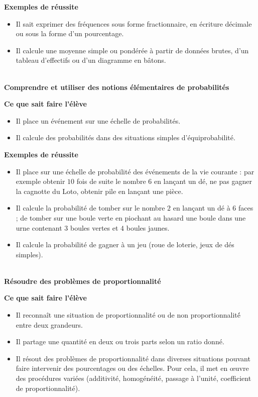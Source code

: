 \documentclass[10pt]{article}
\newcommand{\RR}{\begin{tikzpicture} \draw[Bleu,fill=Bleu] (0,0) circle (0.06); \end{tikzpicture}}
\newcommand{\LR}{\begin{tikzpicture} \draw[Bleu,fill=Bleu] (0.05,0) -- (0,0.075) -- (-0.05,0) -- (0,-0.075) --cycle; \end{tikzpicture}}
\newcommand{\competence}[1]{\par\color{Bleu}\makebox[\linewidth]{\rule{\textwidth}{2pt}}\\{\bfseries\Large#1}\color{black}\vspace{1em}}
\newenvironment{savoireleves}{%
    \renewcommand{\labelitemi}{\RR}%
    \color{black}%
    \par\textbf{Ce que sait faire l'élève}
    \begin{itemize}
    \setlength{\itemsep}{-0.2em}%
}{
    \end{itemize}
}
\newenvironment{exemplesreussite}{%
    \renewcommand{\labelitemi}{\LR}%
    \renewcommand{\labelitemii}{-}%
    \color{black}%
    \par\textbf{Exemples de réussite}
    \begin{itemize}
    \setlength{\itemsep}{-0.2em}%
}{
    \end{itemize}
}
\begin{document}
\begin{exemplesreussite}
        \item Il sait exprimer des fréquences sous forme fractionnaire, en écriture décimale ou sous la forme d’un pourcentage.
        \item Il calcule une moyenne simple ou pondérée à partir de données brutes, d’un tableau d’effectifs ou d’un diagramme en bâtons.
    \end{exemplesreussite}

    \clearpage
    \competence{Comprendre et utiliser des notions élémentaires de probabilités}
    \begin{savoireleves}
        \item Il place un événement sur une échelle de probabilités.
        \item Il calcule des probabilités dans des situations simples d’équiprobabilité.
    \end{savoireleves} 
    \begin{exemplesreussite}
        \item Il place sur une échelle de probabilité des événements de la vie courante : par exemple obtenir $10$ fois de suite le nombre $6$ en lançant un dé, ne pas gagner la cagnotte du Loto, obtenir pile en lançant une pièce.
        \item Il calcule la probabilité de tomber sur le nombre $2$ en lançant un dé à $6$ faces ; de tomber sur une boule verte en piochant au hasard une boule dans une urne contenant $3$ boules vertes et $4$ boules jaunes.
        \item Il calcule la probabilité de gagner à un jeu (roue de loterie, jeux de dés simples).
    \end{exemplesreussite}

    \competence{Résoudre des problèmes de proportionnalité}
    \begin{savoireleves}
        \item Il reconnaît une situation de proportionnalité ou de non proportionnalité́ entre deux grandeurs.
        \item Il partage une quantité en deux ou trois parts selon un ratio donné.
        \item Il résout des problèmes de proportionnalité dans diverses situations pouvant faire intervenir des pourcentages ou des échelles. Pour cela, il met en œuvre des procédures variées (additivité, homogénéité, passage à l’unité, coefficient de proportionnalité).
    \end{savoireleves}
\end{document}

